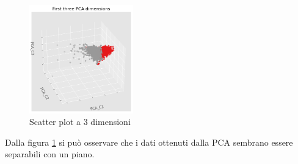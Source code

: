 \begin{figure}[!ht]
      \centering
      \includegraphics[width=0.4\textwidth]{img/analisi/pcaNuovoDataset.png}
      \caption{Scatter plot a 3 dimensioni}
      \label{fig:pca-3d}
\end{figure}

Dalla figura \ref{fig:pca-3d} si può osservare che i dati ottenuti dalla PCA
sembrano essere separabili con un piano.